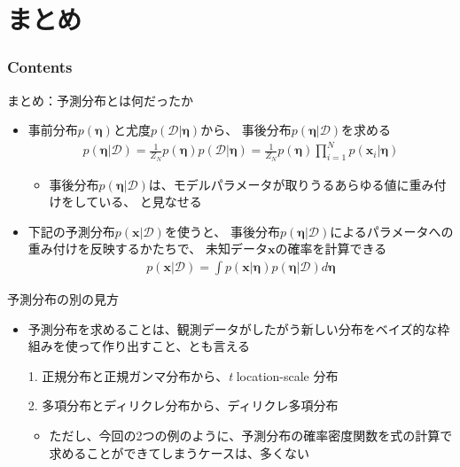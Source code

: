 \documentclass[aspectratio=169,unicode,dvipdfmx,14pt]{beamer}
\begin{document}
\section{まとめ}

\begin{frame}\frametitle{Contents}
\Large \tableofcontents[currentsection]
\end{frame}

\begin{frame}{まとめ：予測分布とは何だったか}
\begin{itemize}
\item 事前分布$p(\bm{\eta})$と尤度$p(\mathcal{D}|\bm{\eta})$から、
事後分布$p(\bm{\eta} | \mathcal{D})$を求める
\begin{align}
p(\bm{\eta} | \mathcal{D}) = \frac{1}{Z_N} p(\bm{\eta}) p(\mathcal{D}|\bm{\eta})
= \frac{1}{Z_N} p(\bm{\eta}) \prod_{i=1}^N p(\bm{x}_i | \bm{\eta})
\end{align}
\vspace{-.2in}
\begin{itemize}
\item 事後分布$p(\bm{\eta} | \mathcal{D})$は、モデルパラメータが取りうるあらゆる値に重み付けをしている、
と見なせる
\end{itemize}
\item 下記の予測分布$p(\bm{x}|\mathcal{D})$を使うと、
事後分布$p(\bm{\eta} | \mathcal{D})$によるパラメータへの重み付けを反映するかたちで、
未知データ$\bm{x}$の確率を計算できる
\begin{align}
p(\bm{x}|\mathcal{D}) = \int p(\bm{x}|\bm{\eta}) p(\bm{\eta} | \mathcal{D}) d\bm{\eta}
\end{align}
\end{itemize}
\end{frame}

\begin{frame}{予測分布の別の見方}
\begin{itemize}
\item 予測分布を求めることは、観測データがしたがう新しい分布をベイズ的な枠組みを使って作り出すこと、とも言える
\item[1.] 正規分布と正規ガンマ分布から、\textit{t} location-scale 分布
\item[2.] 多項分布とディリクレ分布から、ディリクレ多項分布 
\begin{itemize}
\item ただし、今回の2つの例のように、予測分布の確率密度関数を式の計算で求めることができてしまうケースは、多くない
\end{itemize}
\end{itemize}
\end{frame}
\end{document}
